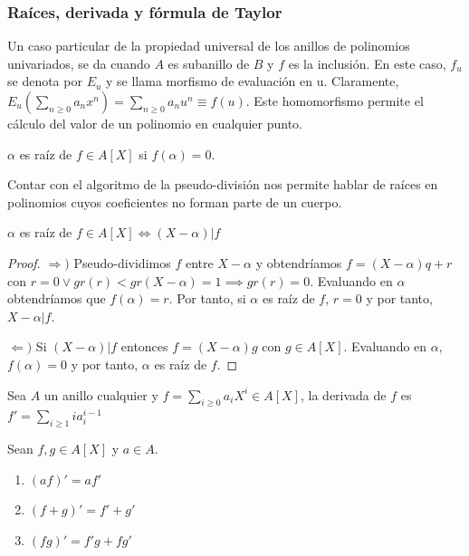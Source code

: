 \subsubsection{Raíces, derivada y fórmula de Taylor}

\begin{definition}
Un caso particular de la propiedad universal de los anillos de polinomios univariados, se da cuando $A$ es subanillo de $B$ y $f$ es la inclusión. En este caso, $f_u$ se denota por $E_u$ y se llama morfismo de evaluación en u. Claramente, $E_u(\sum_{n \ge 0} a_n x^n) = \sum_{n \ge 0} a_n u^n \equiv f(u)$. Este homomorfismo permite el cálculo del valor de un  polinomio en cualquier punto.
\end{definition}

\begin{definition}
$\alpha$ es raíz de $f \in A[X]$ si $f(\alpha) = 0$. 
\end{definition}

Contar con el algoritmo de la pseudo-división nos permite hablar de raíces en polinomios cuyos coeficientes no forman parte de un cuerpo. 

\begin{proposition}
$\alpha$ es raíz de $f \in A[X] \iff (X-\alpha) | f$
\end{proposition}
\begin{proof}
$\Rightarrow)$ Pseudo-dividimos $f$ entre $X-\alpha$ y obtendríamos $f = (X-\alpha)q + r$ con $r = 0 \lor gr(r) < gr(X-\alpha) = 1 \implies gr(r) = 0$. Evaluando en $\alpha$ obtendríamos que $f(\alpha) = r$. Por tanto, si $\alpha$ es raíz de $f$, $r = 0$ y por tanto, $X-\alpha|f$. 

$\Leftarrow)$ Si $(X-\alpha)|f$ entonces $f = (X-\alpha)g$ con $g \in A[X]$. Evaluando en $\alpha$, $f(\alpha) = 0$ y por tanto, $\alpha$ es raíz de $f$. 
\end{proof}

\begin{definition}
Sea $A$ un anillo cualquier y $f = \sum_{i \ge 0} a_iX^i \in A[X]$, la derivada de $f$ es $f' = \sum_{i \ge 1} ia_i^{i-1}$
\end{definition}

\begin{proposition}
Sean $f,g \in A[X]$ y $a \in A$. 

\begin{enumerate}
\item $(af)' = af'$
\item $(f+g)' = f'+g'$
\item $(fg)' = f'g + fg'$
\end{enumerate}
\end{proposition}

